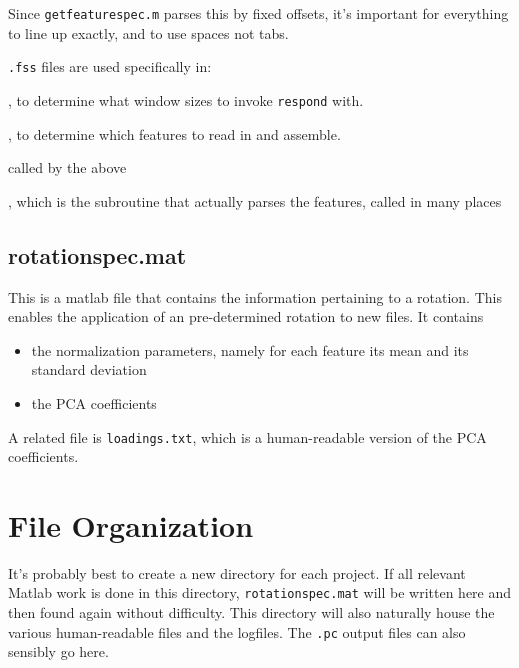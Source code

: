 \documentclass[11pt]{article}
\begin{document}
Since {\tt getfeaturespec.m} parses this by fixed offsets, it's
important for everything to line up exactly, and to use spaces not
tabs.

{\tt .fss} files are used specifically in:

\begin{description}  \setlength{\itemsep}{0pt}\setlength{\parskip}{0pt}
\item[multirespond.py], to determine what window sizes to invoke {\tt respond} with.

\item[load\_features.m], to determine which features to read in and assemble. 

\item[fetch\_and\_preen.m] called by the above

\item[getfeaturespec.m], which is  the subroutine that actually parses the features, called in many places
\end{description}

\subsection{rotationspec.mat}

This is a matlab file that contains the information pertaining to a
rotation.  This enables the application of an pre-determined rotation 
to new files.  It contains 

\begin{itemize}  \setlength{\itemsep}{0pt}\setlength{\parskip}{0pt}
\item the normalization parameters, namely for each feature its mean
  and its standard deviation

\item the PCA coefficients
\end{itemize}

A related file is {\tt loadings.txt}, which is a human-readable
version of the PCA coefficients.


\section{File Organization}

It's probably best to create a new directory for each project.  If all
relevant Matlab work is done in this directory, {\tt rotationspec.mat}
will be written here and then found again without difficulty.  This
directory will also naturally house the various human-readable files
and the logfiles.  The {\tt .pc} output files can also sensibly go here.
\end{document}
